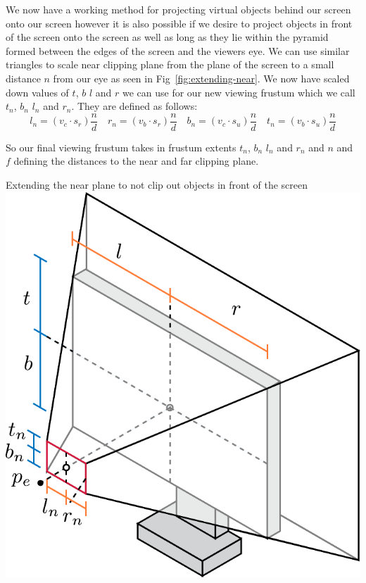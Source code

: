 We now have a working method for projecting virtual objects behind our screen onto our screen however it is also possible if we desire to project objects in front of the screen onto the screen as well as long as they lie within the pyramid formed between the edges of the screen and the viewers eye. We can use similar triangles to scale near clipping plane from the plane of the screen to a small distance $n$ from our eye as seen in Fig~\ref{fig:extending-near}. We now have scaled down values of $t$, $b$ $l$ and $r$ we can use for our new viewing frustum which we call $t_n$, $b_n$ $l_n$ and $r_n$. They are defined as follows:
\[
    l_n = (v_c \cdot s_r) \frac{n}{d} \quad r_n = (v_b \cdot s_r) \frac{n}{d} \quad b_n = (v_c \cdot s_u) \frac{n}{d} \quad t_n = (v_b \cdot s_u) \frac{n}{d}
\]

So our final viewing frustum takes in frustum extents $t_n$, $b_n$ $l_n$ and $r_n$ and $n$ and $f$ defining the distances to the near and far clipping plane.
\begin{figureBox}[label={fig:extending-near}]{Extending the near plane to not clip out objects in front of the screen}
    \centering
    \includegraphics[width = 0.5\linewidth]{./background/figures/projection/extending-near.pdf}
\end{figureBox}


